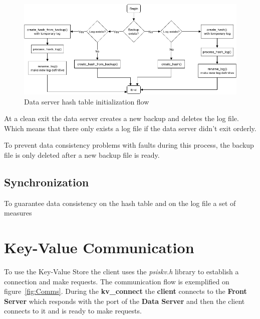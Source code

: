 \documentclass[12pt]{article} %
\begin{document}
\begin{figure}[H]
\centering
\includegraphics[width=\textwidth]{./Pictures/BackupLogFlow.png}
\caption{Data server hash table initialization flow}\label{fig:BackupLogFlow}
\end{figure}

At a clean exit the data server creates a new backup and deletes the log file. 
Which means that there only exists a log file if the data server didn't exit orderly.

To prevent data consistency problems with faults during this process, the 
backup file is only deleted after a new backup file is ready.



\subsection{Synchronization}
\label{sub:Synchronization}

To guarantee data consistency on the hash table and on the log file a set of measures

\section{Key-Value Communication}

To use the Key-Value Store the client uses the \emph{psiskv.h} library to establish a 
connection and make requests. The communication flow is exemplified on figure~\ref{fig:Comms}. 
During the \textbf{kv\_connect} the \textbf{client} connects to the \textbf{Front Server} which responds 
with the port of the \textbf{Data Server} and then the client connects to it and is ready 
to make requests.
\end{document}
